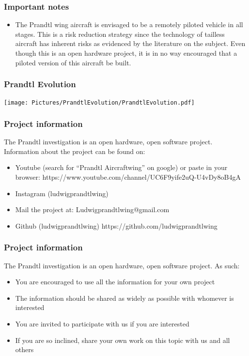 \documentclass{beamer}
\begin{document}
\begin{frame}
\frametitle{Important notes}

\begin{itemize}
\item The Prandtl wing aircraft is envisaged to be a remotely piloted vehicle in all stages.  This is a risk reduction strategy since the technology of tailless aircraft has inherent risks as evidenced by the literature on the subject.  Even though this is an open hardware project, it is in no way encouraged that a piloted version of this aircraft be built.
\end{itemize}

\end{frame}


\begin{frame}
\frametitle{Prandtl Evolution}

\texttt{[image: Pictures/PrandtlEvolution/PrandtlEvolution.pdf]}

\end{frame}


\begin{frame}
\frametitle{Project information}

The Prandtl investigation is an open hardware, open software project.  Information about the project can be found on:  

\begin{itemize}
\item Youtube (search for ``Prandtl Aircraftwing'' on google) or paste in your browser:
https://www.youtube.com/channel/UC6F9yife2uQ-U4vDy8oB4gA
\item Instagram (ludwigprandtlwing)
\item Mail the project at: Ludwigprandtlwing@gmail.com 
\item Github (ludwigprandtlwing) https://github.com/ludwigprandtlwing
\end{itemize}

\end{frame}




\begin{frame}
\frametitle{Project information}

The Prandtl investigation is an open hardware, open software project.  As such:  

\begin{itemize}
\item You are encouraged to use all the information for your own project
\item The information should be shared as widely as possible with whomever is interested
\item You are invited to participate with us if you are interested
\item If you are so inclined, share your own work on this topic with us and all others
\end{itemize}

\end{frame}
\end{document}
